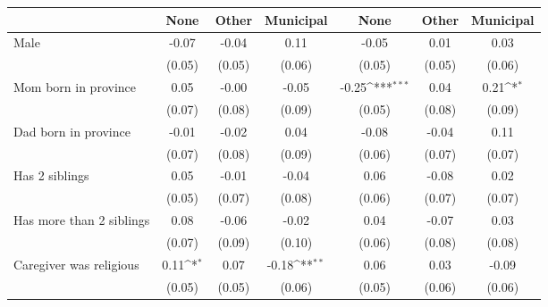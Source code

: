 {
\def\sym#1{\ifmmode^{#1}\else\(^{#1}\)\fi}
\begin{tabular}{l*{6}{c}}
\toprule
                    &\multicolumn{1}{c}{None}&\multicolumn{1}{c}{Other}&\multicolumn{1}{c}{Municipal}&\multicolumn{1}{c}{None}&\multicolumn{1}{c}{Other}&\multicolumn{1}{c}{Municipal}\\
\midrule
Male                &       -0.07         &       -0.04         &        0.11         &       -0.05         &        0.01         &        0.03         \\
                    &      (0.05)         &      (0.05)         &      (0.06)         &      (0.05)         &      (0.05)         &      (0.06)         \\
\addlinespace
Mom born in province&        0.05         &       -0.00         &       -0.05         &       -0.25\sym{***}&        0.04         &        0.21\sym{*}  \\
                    &      (0.07)         &      (0.08)         &      (0.09)         &      (0.05)         &      (0.08)         &      (0.09)         \\
\addlinespace
Dad born in province&       -0.01         &       -0.02         &        0.04         &       -0.08         &       -0.04         &        0.11         \\
                    &      (0.07)         &      (0.08)         &      (0.09)         &      (0.06)         &      (0.07)         &      (0.07)         \\
\addlinespace
Has 2 siblings      &        0.05         &       -0.01         &       -0.04         &        0.06         &       -0.08         &        0.02         \\
                    &      (0.05)         &      (0.07)         &      (0.08)         &      (0.06)         &      (0.07)         &      (0.07)         \\
\addlinespace
Has more than 2 siblings&        0.08         &       -0.06         &       -0.02         &        0.04         &       -0.07         &        0.03         \\
                    &      (0.07)         &      (0.09)         &      (0.10)         &      (0.06)         &      (0.08)         &      (0.08)         \\
\addlinespace
Caregiver was religious&        0.11\sym{*}  &        0.07         &       -0.18\sym{**} &        0.06         &        0.03         &       -0.09         \\
                    &      (0.05)         &      (0.05)         &      (0.06)         &      (0.05)         &      (0.06)         &      (0.06)         \\

\end{tabular}}
